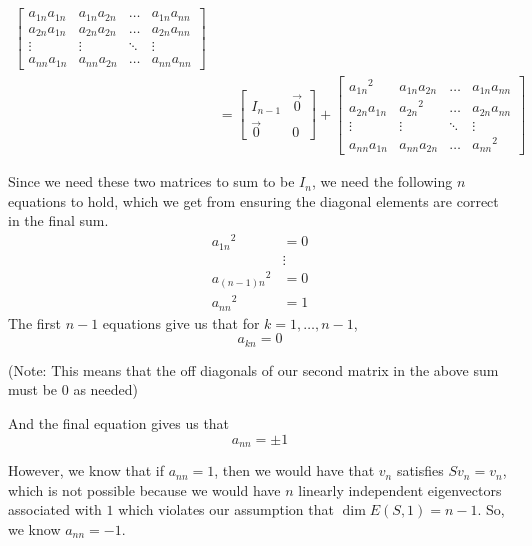 \documentclass[answers]{exam}
\begin{document}
\begin{questions}
\begin{parts}
\begin{solution}
\begin{align*}
\begin{bmatrix}
                        a_{1n}{a_{1n}} & a_{1n}{a_{2n}} & \dots & a_{1n}{a_{nn}} \\
                        a_{2n}{a_{1n}} & a_{2n}{a_{2n}} & \dots & a_{2n}{a_{nn}} \\
                        \vdots & \vdots &\ddots & \vdots \\
                        a_{nn}{a_{1n}} & a_{nn}{a_{2n}} & \dots & a_{nn}{a_{nn}} 
                    \end{bmatrix} \\
                &= \begin{bmatrix} I_{n-1} & \vec{0} \\
                    \vec{0} & 0\end{bmatrix} + 
                    \begin{bmatrix}
                        {a_{1n}}^2 & a_{1n}{a_{2n}} & \dots & a_{1n}{a_{nn}} \\
                        a_{2n}{a_{1n}} & {a_{2n}}^2 & \dots & a_{2n}{a_{nn}} \\
                        \vdots & \vdots &\ddots & \vdots \\
                        a_{nn}{a_{1n}} & a_{nn}{a_{2n}} & \dots & {a_{nn}}^2 
                    \end{bmatrix}
            \end{align*}

            Since we need these two matrices to sum to be $I_n$, we need the following $n$ equations to hold, 
            which we get from ensuring the diagonal elements are correct in the final sum.
            \begin{align*}
                {a_{1n}}^2 &= 0 \\
                &\vdots\\
                {a_{(n-1)n}}^2 &= 0 \\
                {a_{nn}}^2 &= 1
            \end{align*}
            The first $n-1$ equations give us that for $k=1,\dots,n-1$,
            \[
                a_{kn} = 0
            \]

            (Note: This means that the off diagonals of our second matrix in the above sum must be $0$ as needed)

            And the final equation gives us that
            \[
                a_{nn} = \pm 1
            \]

            However, we know that if $a_{nn} = 1$, then we would have that $v_n$ satisfies $Sv_n = v_n$, which
            is not possible because we would have $n$ linearly independent eigenvectors associated with $1$ which
            violates our assumption that $\dim E(S,1) = n-1$. So, we know $a_{nn} = -1$. 


\end{solution}
\end{parts}
\end{questions}
\end{document}
